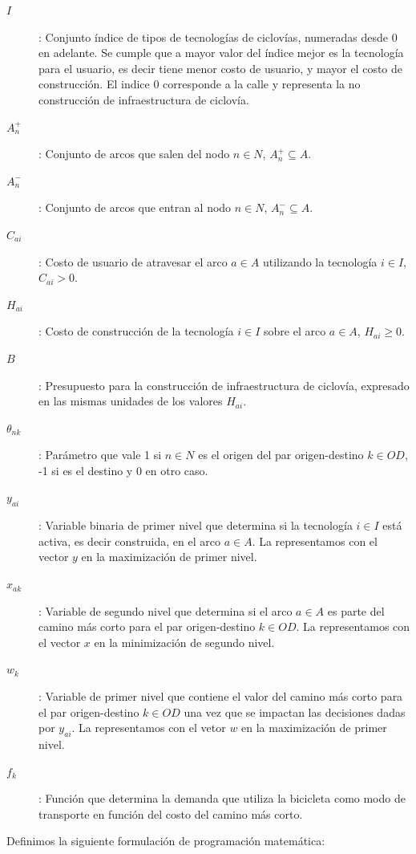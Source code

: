 \begin{description}
  \item[$I$]: Conjunto índice de tipos de tecnologías de ciclovías, numeradas desde $0$ en adelante. Se cumple que a mayor valor del índice mejor es la tecnología para el usuario, es decir tiene menor costo de usuario, y mayor el costo de construcción. El indice 0 corresponde a la calle y representa la no construcción de infraestructura de ciclovía.
  \item[$A_n^+$]: Conjunto de arcos que salen del nodo $n \in N$, $A_n^+ \subseteq A$.
  \item[$A_n^-$]: Conjunto de arcos que entran al nodo $n \in N$, $A_n^- \subseteq A$.
  \item[$C_{ai}$]: Costo de usuario de atravesar el arco $a \in A$ utilizando la tecnología $i \in I$, $C_{ai} > 0$.
  \item[$H_{ai}$]: Costo de construcción de la tecnología $i \in I$ sobre el arco $a \in A$, $H_{ai} \geq 0$.
  \item[$B$]: Presupuesto para la construcción de infraestructura de ciclovía, expresado en las mismas unidades de los valores $H_{ai}$.
  \item[$\theta_{nk}$]: Parámetro que vale 1 si $n \in N$ es el origen del par origen-destino $k \in OD$, -1 si es el destino y 0 en otro caso.
  \item[$y_{ai}$]: Variable binaria de primer nivel que determina si la tecnología $i \in I$ está activa, es decir construida, en el arco $a \in A$. La representamos con el vector $y$ en la maximización de primer nivel.
  \item[$x_{ak}$]: Variable de segundo nivel que determina si el arco $a \in A$ es parte del camino más corto para el par origen-destino $k \in OD$. La representamos con el vector $x$ en la minimización de segundo nivel.
  \item[$w_k$]: Variable de primer nivel que contiene el valor del camino más corto para el par origen-destino $k \in OD$ una vez que se impactan las decisiones dadas por $y_{ai}$. La representamos con el vetor $w$ en la maximización de primer nivel.
  \item[$f_k$]: Función que determina la demanda que utiliza la bicicleta como modo de transporte en función del costo del camino más corto.
\end{description}

\clearpage
Definimos la siguiente formulación de programación matemática:

